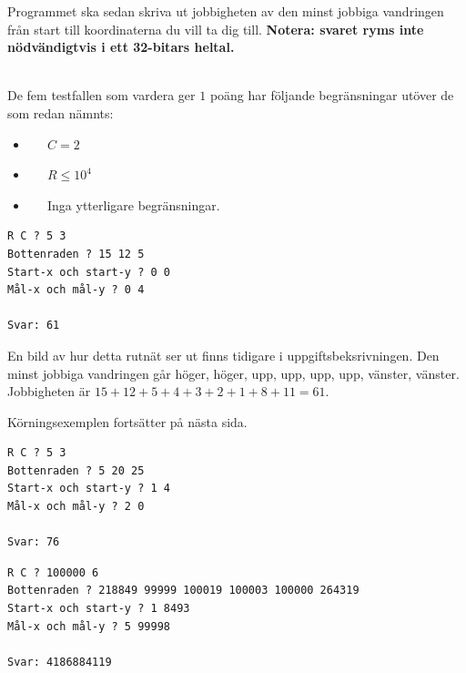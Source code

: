 Programmet ska sedan skriva ut jobbigheten av den minst jobbiga vandringen från start till koordinaterna du vill ta dig till.
\textbf{Notera: svaret ryms inte nödvändigtvis i ett 32-bitars heltal.}

\\
De fem testfallen som vardera ger $1$ poäng har följande begränsningar utöver de som redan nämnts:
\begin{itemize}
    \item[(1)] $\;\;\;\;$ $C=2$ 
    \item[(2-3)] $\;\;\;\;$ $R \leq 10^4$ 
    \item[(4-5)] $\;\;\;\;$ Inga ytterligare begränsningar.
\end{itemize}

\vspace{0.6cm}

\begin{verbatim}
R C ? 5 3
Bottenraden ? 15 12 5
Start-x och start-y ? 0 0
Mål-x och mål-y ? 0 4

Svar: 61
\end{verbatim}

 En bild av hur detta rutnät ser ut finns tidigare i uppgiftsbeksrivningen. Den minst jobbiga vandringen går höger, höger, upp, upp, upp, upp, vänster, vänster.
Jobbigheten är $15+12+5+4+3+2+1+8+11=61$.

\vspace{3cm}

\begin{center}
    {\LARGE Körningsexemplen fortsätter på nästa sida.}
\end{center}

\newpage

\begin{verbatim}
R C ? 5 3
Bottenraden ? 5 20 25
Start-x och start-y ? 1 4
Mål-x och mål-y ? 2 0

Svar: 76
\end{verbatim}

\vspace{1cm}

\begin{verbatim}
R C ? 100000 6
Bottenraden ? 218849 99999 100019 100003 100000 264319
Start-x och start-y ? 1 8493
Mål-x och mål-y ? 5 99998

Svar: 4186884119
\end{verbatim}


\newpage
{}

